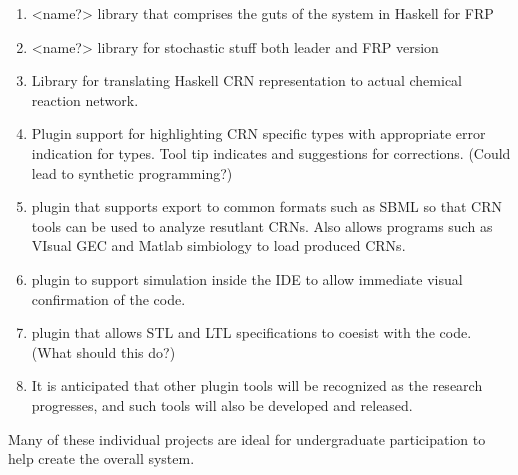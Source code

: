 \begin{enumerate}
	\item <name?> library that comprises the guts of the system in Haskell for FRP
	
	\item <name?>  library for stochastic stuff both leader and FRP version
	
	\item Library for translating Haskell CRN representation to actual chemical reaction network.
	
	\item Plugin support for highlighting CRN specific types with appropriate error indication for types.  Tool tip indicates and suggestions for corrections.  (Could lead to synthetic programming?)
	
	\item plugin that supports export to common formats such as SBML so that CRN tools can be used to analyze resutlant CRNs.  Also allows programs such as VIsual GEC and Matlab simbiology to load produced CRNs.
	
	\item plugin to support simulation inside the IDE to allow immediate visual confirmation of the code.
	
	\item plugin that allows STL and LTL specifications to coesist with the code.  (What should this do?)
	
	\item It is anticipated that other plugin tools will be recognized as the research progresses, and such tools will also be developed and released.
	

\end{enumerate}

Many of these individual projects are ideal for undergraduate participation to help create the overall system.


